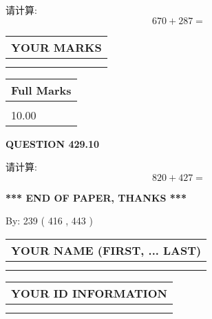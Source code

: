 \documentclass{ctexart}
\begin{document}
  
 
请计算:
\begin{equation}
670 +  %
287 = \nonumber
\end{equation}
 

 

 
  
\vspace{0.2in}
  
\noindent\begin{tabular}{|l|}
\hline
 YOUR MARKS  \\
\hline
 \\ 
 \\ 
\hline
\end{tabular}
\hspace{0.05in} \begin{tabular}{|l|}
\hline
 Full Marks  \\
\hline
 \\ 
10.00 \\
\hline
\end{tabular}
{\textbf{\Large{QUESTION
429.10 
}}}
  
  
 
请计算:
\begin{equation}
820 +  %
427 = \nonumber
\end{equation}
 

 

 
   
   
 \vspace{0.2in}
 
   
   
   
   
\vspace{1.0in} 
{\textbf{\large{ *** END OF PAPER, THANKS *** }}} 
   
   
\hspace{1.0in} By: 
 239 ( 416 ,  443 )
   
   
   
   
\newpage 
\setcounter{page}{ 
   430001 } 
   
   
   
   
\noindent\begin{tabular}{|l|}
\hline
YOUR NAME (FIRST, ... LAST)  \\
\hline
 \\ 
 \\ 
\hline
\end{tabular}
\hspace{0.05in} \begin{tabular}{|l|}
\hline
 YOUR   ID   INFORMATION  \\
\hline
 \\ 
 \\ 
\hline
\end{tabular}
   
\end{document}
